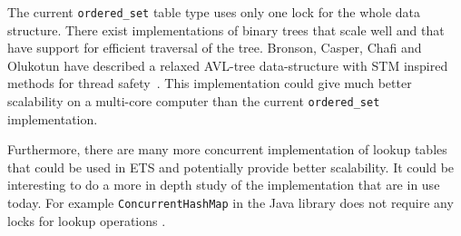 \documentclass[aps,pre,preprint,nofootinbib]{revtex4}
\begin{document}
The current \verb|ordered_set| table type uses only one lock for the whole data structure.
There exist implementations of binary trees that scale well and that have support for efficient traversal of the tree.
Bronson, Casper, Chafi and Olukotun have described a relaxed AVL-tree data-structure with STM inspired methods for thread safety~\cite{BronsonPracTree}.
This implementation could give much better scalability on a multi-core computer than the current \verb|ordered_set| implementation.

Furthermore, there are many more concurrent implementation of lookup tables that could be used in ETS and potentially provide better scalability.
It could be interesting to do a more in depth study of the implementation that are in use today.
For example \verb|ConcurrentHashMap| in the Java library does not require any locks for lookup operations \cite{BrianConcHashMap}.




\end{document}
